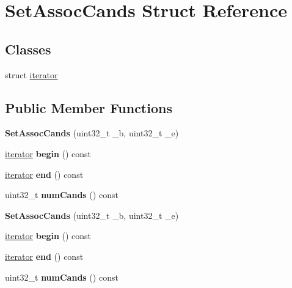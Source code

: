 \hypertarget{structSetAssocCands}{\section{Set\-Assoc\-Cands Struct Reference}
\label{structSetAssocCands}
}
\subsection*{Classes}
\begin{DoxyCompactItemize}
\item 
struct \hyperlink{structSetAssocCands_1_1iterator}{iterator}
\end{DoxyCompactItemize}
\subsection*{Public Member Functions}
\begin{DoxyCompactItemize}
\item 
\hypertarget{structSetAssocCands_abc75b9968cf5d046010b87584d039bdc}{{\bfseries Set\-Assoc\-Cands} (uint32\-\_\-t \-\_\-b, uint32\-\_\-t \-\_\-e)}\label{structSetAssocCands_abc75b9968cf5d046010b87584d039bdc}

\item 
\hypertarget{structSetAssocCands_a97210552bf6ee909606ffcfe6cfe8596}{\hyperlink{structSetAssocCands_1_1iterator}{iterator} {\bfseries begin} () const }\label{structSetAssocCands_a97210552bf6ee909606ffcfe6cfe8596}

\item 
\hypertarget{structSetAssocCands_abfeadb7feddbaa7fa90c1618b2d75040}{\hyperlink{structSetAssocCands_1_1iterator}{iterator} {\bfseries end} () const }\label{structSetAssocCands_abfeadb7feddbaa7fa90c1618b2d75040}

\item 
\hypertarget{structSetAssocCands_a701facbe2d312e18f6d149ba9dd7901f}{uint32\-\_\-t {\bfseries num\-Cands} () const }\label{structSetAssocCands_a701facbe2d312e18f6d149ba9dd7901f}

\item 
\hypertarget{structSetAssocCands_abc75b9968cf5d046010b87584d039bdc}{{\bfseries Set\-Assoc\-Cands} (uint32\-\_\-t \-\_\-b, uint32\-\_\-t \-\_\-e)}\label{structSetAssocCands_abc75b9968cf5d046010b87584d039bdc}

\item 
\hypertarget{structSetAssocCands_a97210552bf6ee909606ffcfe6cfe8596}{\hyperlink{structSetAssocCands_1_1iterator}{iterator} {\bfseries begin} () const }\label{structSetAssocCands_a97210552bf6ee909606ffcfe6cfe8596}

\item 
\hypertarget{structSetAssocCands_abfeadb7feddbaa7fa90c1618b2d75040}{\hyperlink{structSetAssocCands_1_1iterator}{iterator} {\bfseries end} () const }\label{structSetAssocCands_abfeadb7feddbaa7fa90c1618b2d75040}

\item 
\hypertarget{structSetAssocCands_a701facbe2d312e18f6d149ba9dd7901f}{uint32\-\_\-t {\bfseries num\-Cands} () const }\label{structSetAssocCands_a701facbe2d312e18f6d149ba9dd7901f}

\end{DoxyCompactItemize}
